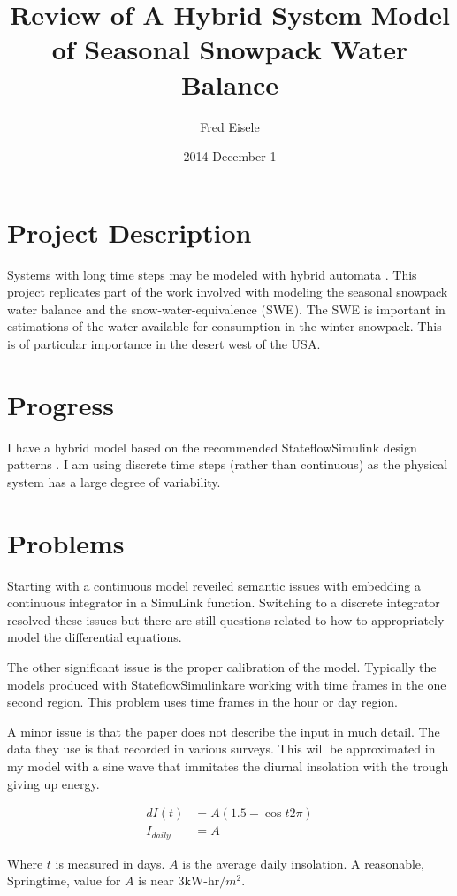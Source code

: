 \documentclass{article}
\title{Review of A Hybrid System Model of Seasonal Snowpack Water Balance}
\author{Fred Eisele }
\date{2014 December 1}
\begin{document}
\maketitle

\section{Project Description}

Systems with long time steps may be modeled with hybrid automata
\citep{kerkez2010swb}.
This project replicates part of the work involved with modeling
the seasonal snowpack water balance and the snow-water-equivalence (SWE).
The SWE is important in estimations of the water available
for consumption in the winter snowpack.
This is of particular importance in the desert west of the USA.

\section{Progress}

I have a hybrid model based on the recommended
Stateflow\textregistered Simulink\textregistered
design patterns \citep{matlab2009ssdp}.
I am using discrete time steps (rather than continuous) as the
physical system has a large degree of variability.

\section{Problems}

Starting with a continuous model reveiled semantic
issues with embedding a continuous integrator in a SimuLink function.
Switching to a discrete integrator resolved these issues but
there are still questions related to how to appropriately
model the differential equations.

The other significant issue is the proper calibration of the model.
Typically the models produced with
Stateflow\textregistered Simulink\textregistered are working
with time frames in the one second region.
This problem uses time frames in the hour or day region.

A minor issue is that the paper does not describe
the input in much detail.
The data they use is that recorded in various surveys.
This will be approximated in my model with a sine wave
that immitates the diurnal insolation with the trough
giving up energy.

\begin{align}
dI(t) &= A ( 1.5 - \cos{ t 2 \pi } )  \\
I_{daily} &= A
\end{align}

Where $t$ is measured in days.
$A$ is the average daily insolation.
A reasonable, Springtime, value for $A$ is near $3 \text{kW-hr}/m^2$.





\end{document}
